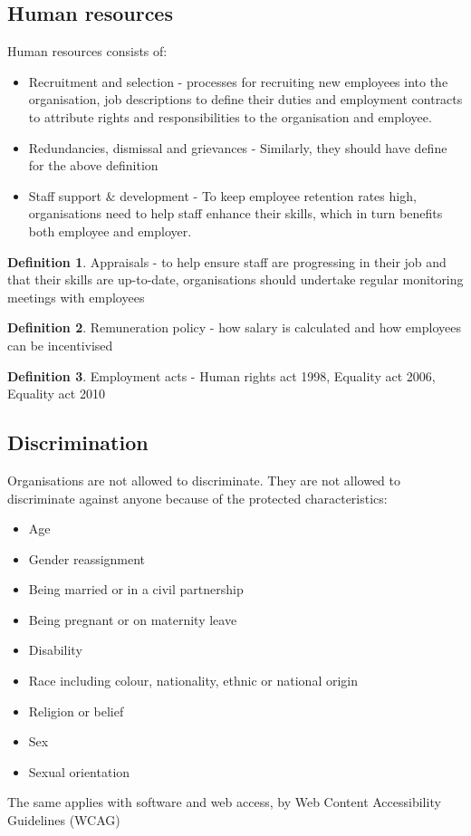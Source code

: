 \documentclass[a4paper]{article}
\theoremstyle{plain}
\theoremstyle{definition}
\newtheorem{defn}{Definition}[section]
\theoremstyle{remark}
\begin{document}
\subsection{Human resources}
Human resources consists of:
\begin{itemize}
	\item Recruitment and selection - processes for recruiting new employees into the organisation, job descriptions to define their duties and employment contracts to attribute rights and responsibilities to the organisation and employee.
	\item Redundancies, dismissal and grievances - Similarly,  they should have define for the above definition
	\item Staff support $\&$ development - To keep employee retention rates high, organisations need to help staff enhance their skills, which in turn benefits both employee and employer.
\end{itemize}
\begin{defn}
	Appraisals - to help ensure staff are progressing in their job and that their skills are up-to-date, organisations should undertake regular monitoring meetings with employees
\end{defn}
\begin{defn}
	Remuneration policy - how salary is calculated and how employees can be incentivised
\end{defn}
\begin{defn}
	Employment acts - Human rights act 1998, Equality act 2006, Equality act 2010
\end{defn}
\subsection{Discrimination}
Organisations are not allowed to discriminate. They are not allowed to discriminate against anyone because of the protected characteristics:
\begin{itemize}
	\item Age
	\item Gender reassignment
	\item Being married or in a civil partnership
	\item Being pregnant or on maternity leave
	\item Disability
	\item Race including colour, nationality, ethnic or national origin
	\item Religion or belief
	\item Sex
	\item Sexual orientation
\end{itemize}
The same applies with software and web access, by Web Content Accessibility Guidelines (WCAG)
\end{document}
